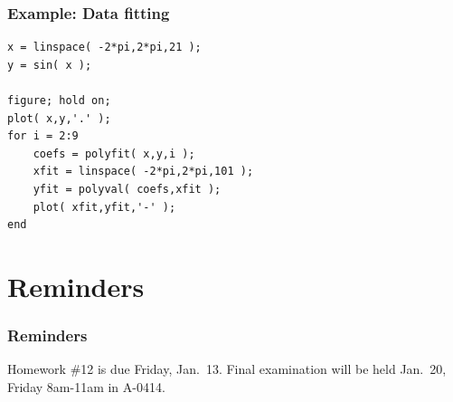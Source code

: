 \documentclass[11pt]{beamer}
\begin{document}
\begin{frame}[fragile]
  \frametitle{Example:  Data fitting}

  \begin{Verbatim}
x = linspace( -2*pi,2*pi,21 );
y = sin( x );

figure; hold on;
plot( x,y,'.' );
for i = 2:9
    coefs = polyfit( x,y,i );
    xfit = linspace( -2*pi,2*pi,101 );
    yfit = polyval( coefs,xfit );
    plot( xfit,yfit,'-' );
end
  \end{Verbatim}
\end{frame}


\section{Reminders}

\begin{frame}
  \frametitle{Reminders}
  \Enlarge

   \begin{itemize}
   	\myitem  Homework \#12 is due Friday, Jan.\ 13.  %
   	\myitem  Final examination will be held Jan.\ 20, Friday 8am-11am in A-0414.  %
   \end{itemize}
\end{frame}
\end{document}
